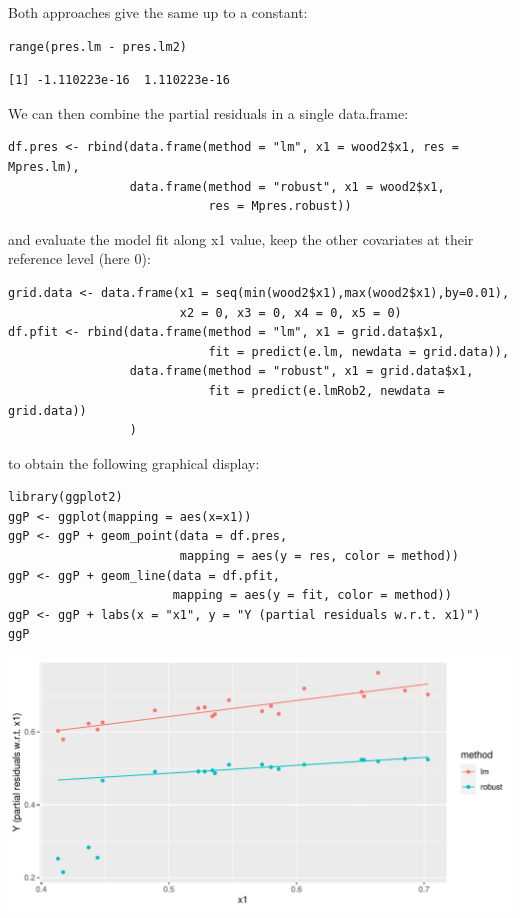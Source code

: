 \documentclass[12pt]{article}
\begin{document}
Both approaches give the same up to a constant:
\lstset{language=r,label= ,caption= ,captionpos=b,numbers=none}
\begin{lstlisting}
range(pres.lm - pres.lm2)
\end{lstlisting}

\begin{verbatim}
[1] -1.110223e-16  1.110223e-16
\end{verbatim}


\noindent  We can then combine the partial residuals in a single data.frame:
\lstset{language=r,label= ,caption= ,captionpos=b,numbers=none}
\begin{lstlisting}
df.pres <- rbind(data.frame(method = "lm", x1 = wood2$x1, res = Mpres.lm),
                 data.frame(method = "robust", x1 = wood2$x1,
                            res = Mpres.robust))
\end{lstlisting}
and evaluate the model fit along x1 value, keep the other covariates at their reference level (here 0):
\lstset{language=r,label= ,caption= ,captionpos=b,numbers=none}
\begin{lstlisting}
grid.data <- data.frame(x1 = seq(min(wood2$x1),max(wood2$x1),by=0.01),
                        x2 = 0, x3 = 0, x4 = 0, x5 = 0)
df.pfit <- rbind(data.frame(method = "lm", x1 = grid.data$x1,
                            fit = predict(e.lm, newdata = grid.data)),
                 data.frame(method = "robust", x1 = grid.data$x1,
                            fit = predict(e.lmRob2, newdata = grid.data))
                 )
\end{lstlisting}

to obtain the following graphical display:
\lstset{language=r,label= ,caption= ,captionpos=b,numbers=none}
\begin{lstlisting}
library(ggplot2)
ggP <- ggplot(mapping = aes(x=x1))
ggP <- ggP + geom_point(data = df.pres,
                        mapping = aes(y = res, color = method))
ggP <- ggP + geom_line(data = df.pfit,
                       mapping = aes(y = fit, color = method))
ggP <- ggP + labs(x = "x1", y = "Y (partial residuals w.r.t. x1)")
ggP
\end{lstlisting}

\begin{center}
\includegraphics[trim={0 0 0 0},width=1\textwidth]{./figures/examples-covariates.pdf}
\label{fig:example-covariate}
\end{center}
\end{document}
